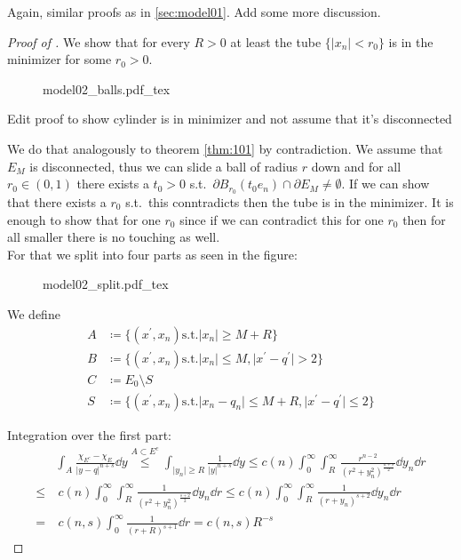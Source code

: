 Again, similar proofs as in \cref{sec:model01}.\newline
Add some more discussion.

\begin{proof}[Proof of ]
	We show that for every \( R > 0 \) at least the tube \( \{\lvert x_n \rvert < r_0 \}
	\) is in the minimizer for some \( r_0 > 0 \). \\
	\begin{figure}[h]
		\centering
		\def\svgscale{1}
		{model02_balls.pdf_tex}
		\caption{}
		\label{fig:105}
	\end{figure}
	\begin{TODO}
		Edit proof to show cylinder is in minimizer and not assume that it's disconnected
	\end{TODO}
	We do that analogously to theorem \cref{thm:101} by contradiction. We assume that \(
	E_M \) is disconnected, thus we can slide a ball of radius \( r \) down and for all \(
	r_0 \in (0, 1) \) there exists a \( t_0 > 0 \) s.t.\ \( \partial B_{r_0}(t_0 e_n) \cap
	\partial E_M \neq \emptyset \). If we can show that there exists a \( r_0 \) s.t.\
	this conntradicts then the tube is in the minimizer. It is enough to show that for one
	\( r_0 \) since if we can contradict this for one \( r_0 \) then for all smaller there
	is no touching as well. \\
	For that we split into four parts as seen in the figure:

	\begin{figure}[ht]
		\centering
		\def\svgscale{1}
		{model02_split.pdf_tex}
		\caption{}
		\label{fig:106}
	\end{figure}
	We define
	\begin{align*}
		A & \coloneqq \{(x^\prime, x_n) \text{s.t.} \lvert x_n \rvert \geq M + R \} \\
		B & \coloneqq \{(x^\prime, x_n) \text{s.t.} \lvert x_n \rvert \leq M, \lvert x^\prime - q^\prime \rvert > 2 \} \\
		C & \coloneqq E_0 \setminus S \\
		S & \coloneqq \{(x^\prime, x_n) \text{s.t.} \lvert x_n - q_n \rvert \leq M + R, \lvert x^\prime - q^\prime \rvert \leq 2\}
	\end{align*}

	Integration over the first part:
	\begin{align*}
		     & \int_A \frac{\chi_{E^c} - \chi_E}{\lvert y - q\rvert^{n + s}} \dd{y} \overset{A \subset E^c}{\leq} \int_{\lvert y_n \rvert \geq R} \frac{1}{\lvert y \rvert^{n + s}} \dd{y} \leq c(n) \int_0^\infty \int_R^\infty \frac{r^{n - 2}}{(r^2 + y_n^2)^{\frac{n + s}{2}}} \dd{y_n} \dd{r} \\
		\leq & \ c(n) \int_0^\infty \int_R^\infty \frac{1}{(r^2 + y_n^2)^{\frac{s + 2}{2}}} \dd{y_n} \dd{r} \leq c(n) \int_0^\infty \int_R^\infty \frac{1}{(r + y_n)^{s + 2}} \dd{y_n} \dd{r} \\
		=    & \ c(n, s) \int_0^\infty \frac{1}{(r + R)^{s + 1}} \dd{r} = c(n, s) R^{- s}
	\end{align*}


\end{proof}

